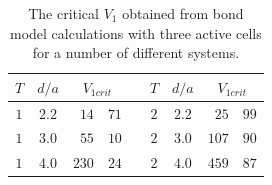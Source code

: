 \begin{table}
  \center
  \begin{tabular}{c c r @{.} l p{0cm} c c r @{.} l}
    $T$ & $d/a$ & \multicolumn{2}{c}{$V_{1crit}$} & &
    $T$ & $d/a$ & \multicolumn{2}{c}{$V_{1crit}$} \\
    \hline 
    $1$ & $2.2$ & $ 14$&$71$ & &
    $2$ & $2.2$ & $ 25$&$99$ \\
    $1$ & $3.0$ & $ 55$&$10$ & &
    $2$ & $3.0$ & $107$&$90$ \\
    $1$ & $4.0$ & $230$&$24$ & &
    $2$ & $4.0$ & $459$&$87$ \\
  \end{tabular}
  \caption[Critical $V_1$ for different systems]{
  The critical $V_1$ obtained from bond model calculations with three active
  cells for a number of different systems.
  }
  \label{tab:critical_V1}
\end{table}

